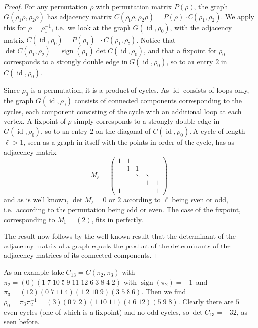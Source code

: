 \documentclass[10pt]{article}
\theoremstyle{definition}
\DeclareMathOperator{\sign}{sign}
\DeclareMathOperator{\id}{id}
\begin{document}
\begin{proof}
    For any permutation $ \rho $ with permutation matrix $ P(\rho) $, the graph
    $ G(\rho_1 \rho,\rho_2\rho) $ has adjacency matrix $
    C(\rho_1\rho,\rho_2\rho) = P(\rho) \cdot C(\rho_1,\rho_2) $. We apply this for
    $ \rho = \rho_1^{-1} $, i.e.\ we look at the graph $ G(\id,\rho_0) $, with the adjacency matrix
    $ C(\id,\rho_0) = P(\rho_1)^{\top} \cdot C(\rho_1,\rho_2) $. Notice that
    $ \det C(\rho_1,\rho_2) = \sign(\rho_1) \det C(\id,\rho_0) $, and that a fixpoint for $ \rho_0 $
    corresponds to a strongly double edge in $ G(\id,\rho_0) $, so to an entry $ 2 $ in $ C(\id,\rho_0) $.

    Since $ \rho_0 $ is a permutation, it is a product of cycles. As $ \id $ consists of loops only, the
    graph $ G(\id,\rho_0) $ consists of connected components corresponding to the cycles, each component
    consisting of the cycle with an additional loop at each vertex. A fixpoint of $ \rho $ simply corresponds
    to a strongly double edge in $ G(\id,\rho_0) $, so to an entry $ 2 $ on the diagonal of
    $ C(\id,\rho_0) $. A cycle of length $ \ell > 1 $, seen as a graph in itself with the points in order of
    the cycle, has as adjacency matrix
    \[ M_{\ell} = \begin{pmatrix} 1 & 1 &        &        &   \\
        & 1 &      1 &        &   \\
        &   & \ddots & \ddots &   \\
        &   &        &      1 & 1 \\
        1 &   &        &        & 1 \end{pmatrix} \]
    and as is well known, $ \det M_{\ell} = 0 $ or $ 2 $ according to $ \ell $ being even or odd, i.e.\
    according to the permutation being odd or even. The case of the fixpoint, corresponding to $ M_1 = (2) $,
    fits in perfectly.

    The result now follows by the well known result that the determinant of the adjacency matrix of a graph
    equals the product of the determinants of the adjacency matrices of its connected components.
\end{proof}

As an example take $ C_{13} = C(\pi_2,\pi_3) $ with
$ \pi_2 = (0)(1\;7\;10\;5\;9\;11\;12\;6\;3\;8\;4\;2) $ with $ \sign(\pi_2) = -1 $, and
$ \pi_3 = (12)(0\;7\;11\;4)(1\;2\;10\;9)(3\;5\;8\;6) $. Then we find
$ \rho_0 = \pi_3 \pi_2^{-1} = (3)(0\;7\;2)(1\;10\;11)(4\;6\;12)(5\;9\;8) $. Clearly there are $ 5 $
even cycles (one of which is a fixpoint) and no odd cycles, so $ \det C_{13} = -32 $, as seen before.
\end{document}
